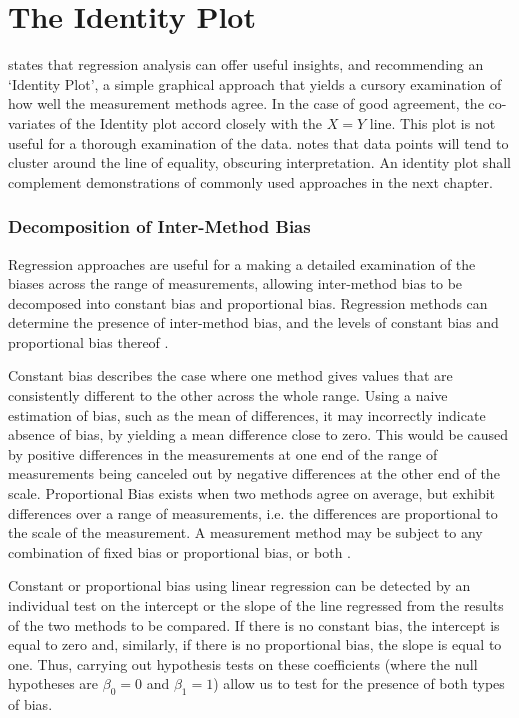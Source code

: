 \documentclass[12pt, a4paper]{report}
\theoremstyle{plain}
\theoremstyle{definition}
\theoremstyle{remark}
\begin{document}
	
	
	
	
	

	\section{The Identity Plot}
	\citet{BA83} states that regression analysis can offer useful insights, and recommending an `Identity Plot', a simple graphical approach that yields a cursory examination of how well the measurement methods agree. In the case of good agreement, the co-variates of the Identity plot accord closely with the $X=Y$ line. This plot is not useful for a thorough examination of the data. \citet{BritHypSoc} notes that data points will tend to cluster around the line of equality,
	obscuring interpretation. An identity plot shall complement demonstrations of commonly used approaches in the next chapter.
	
	
	\subsubsection*{Decomposition of Inter-Method Bias}
Regression approaches are useful for a making a detailed examination of the biases across the range of measurements, allowing inter-method bias to be decomposed into constant bias and proportional bias. Regression methods can determine the presence of inter-method bias, and the levels of constant bias and proportional bias thereof \cite{ludbrook97,ludbrook02}. 

Constant bias describes the case where one method gives values that are consistently different to the other across the whole range. Using a naive estimation of bias, such as the mean of differences, it may incorrectly indicate absence of bias, by yielding a mean difference close to zero. This would be caused by positive differences in the measurements at one end of the range of measurements being canceled out by negative differences at the other end of the scale. Proportional Bias exists when two methods agree on average, but exhibit differences over a range of measurements, i.e. the differences are proportional to the scale of the measurement.	A measurement method may be subject to any combination of fixed bias or proportional bias, or both \citep{ludbrook02}. 
	
	Constant or proportional bias using linear regression can be detected by an individual test on the intercept or the slope of the line regressed from the results of the two methods to be compared. If there is no constant bias, the intercept is equal to zero and, similarly, if there is no proportional bias, the slope is equal to one. Thus, carrying out hypothesis tests on these coefficients (where the null hypotheses are $\beta_0=0$ and $\beta_1=1$) allow us to test for the presence of both types of bias.
\end{document}
